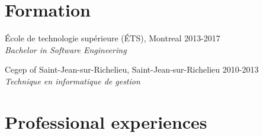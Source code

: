 \documentclass{res}
\newcommand{\inFrench}[1]{}
\newcommand{\inEnglish}[1]{#1}
\begin{document}
\begin{resume}
\section{Formation}
\vspace{6pt}

\inFrench{
	École de technologie supérieure (ÉTS), Montréal
	\hfill 2013-2017 \\
	{\sl Baccalauréat en génie logiciel}

	Cégep de Saint-Jean-sur-Richelieu, Saint-Jean-sur-Richelieu
	\hfill 2010-2013 \\
	{\sl Technique en informatique de gestion}
}
\inEnglish{
	École de technologie supérieure (ÉTS), Montreal
	\hfill 2013-2017 \\
	{\sl Bachelor in Software Engineering}

	Cegep of Saint-Jean-sur-Richelieu, Saint-Jean-sur-Richelieu
	\hfill 2010-2013 \\
	{\sl Technique en informatique de gestion}
}


\inFrench{
	\section{Expériences professionnelles}
}
\inEnglish{
	\section{Professional experiences}
}
\vspace{6pt}

\inFrench{
	Ericsson, Montréal\footnotemark
	\hfill mai à septembre 2016 \\
	{\sl Développeur Java} \hfill (Stage universitaire 3)
	\vspace{0.05in}

	\begin{itemize} \itemsep -2pt
		\item Ajout de fonctionnalités dans une API d'IPTV (Java);
		\item Création et amélioration d'utilitaires pour tests (Bash, JavaScript et Python);
		\item Développement d'une application de contrôle d'accès à base de rôles (RBAC) en Python;
		\item Fonctionnalités d'exportation et d'importation de données d'un serveur LDAP à des serveurs Linux.
	\end{itemize}

}
\end{resume}
\end{document}
